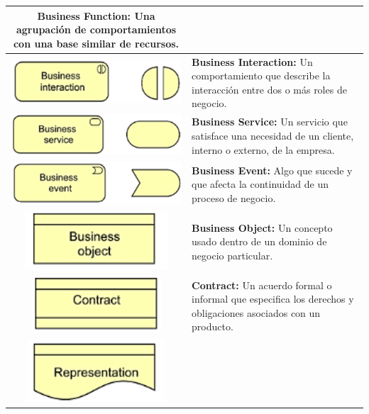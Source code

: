 \begin{longtable}{|c|p{8cm}|}
\textbf{Business Function:} Una agrupación de comportamientos con una base similar de recursos. \\
\hline
\includegraphics{anexos/ARCHI/business/interaction.png} & 
\textbf{Business Interaction:} Un comportamiento que describe la interacción entre dos o más roles de negocio. \\
\hline
\includegraphics{anexos/ARCHI/business/service.png} & 
\textbf{Business Service:} Un servicio que satisface una necesidad de un cliente, interno o externo, de la empresa. \\
\hline
\includegraphics{anexos/ARCHI/business/event.png} & 
\textbf{Business Event:} Algo que sucede y que afecta la continuidad de un proceso de negocio. \\
\hline
\includegraphics{anexos/ARCHI/business/object.png} & 
\textbf{Business Object:} Un concepto usado dentro de un dominio de negocio particular. \\
\hline
\includegraphics{anexos/ARCHI/business/contract.png} & 
\textbf{Contract:} Un acuerdo formal o informal que especifica los derechos y obligaciones asociados con un producto. \\
\hline
\includegraphics{anexos/ARCHI/business/representation.png} & 

\end{longtable}
